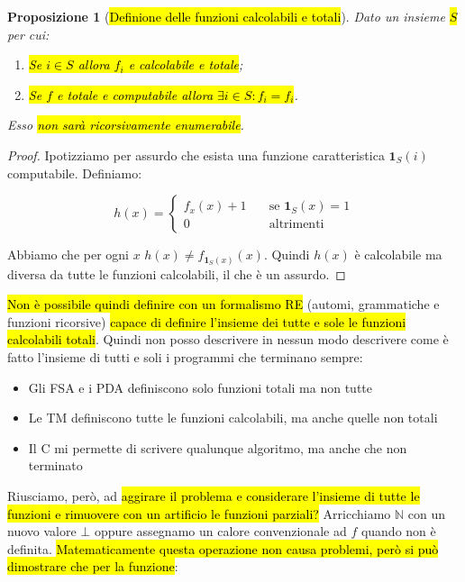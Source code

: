\documentclass[a4paper,11pt,twoside]{article}
\theoremstyle{plain}
\newtheorem{prop}{Proposizione}[section]
\theoremstyle{definition}
\theoremstyle{remark}
\begin{document}
\begin{prop}[\hl{Definione delle funzioni calcolabili e totali}]\label{thm:def-func-tot}
  Dato un insieme \hl{$S$} per cui:

  \begin{enumerate}
    \item \hl{Se $i \in S$ allora $f_i$ e calcolabile e totale};
    \item \hl{Se $f$ e totale e computabile allora $\exists i \in S : f_i =
      f_i$}.
  \end{enumerate}

  Esso \hl{non sarà ricorsivamente enumerabile}.
\end{prop}
\begin{proof}
  Ipotizziamo per assurdo che esista una funzione caratteristica
  $\mathbf{1}_S(i)$ computabile. Definiamo:

  \[
    h(x) =
    \begin{cases}
      f_x(x) + 1 & \quad \text{se } \mathbf{1}_S(x) = 1 \\
      0          & \quad \text{altrimenti}
    \end{cases}
  \]

  Abbiamo che per ogni $x$ $h(x) \neq f_{\mathbf{1}_S(x)}(x)$. Quindi $h(x)$ è
  calcolabile ma diversa da tutte le funzioni calcolabili, il che è un assurdo.
\end{proof}

\hl{Non è possibile quindi definire con un formalismo RE} (automi, grammatiche e
funzioni ricorsive) \hl{capace di definire l'insieme dei tutte e sole le
funzioni calcolabili totali}. Quindi non posso descrivere in nessun modo
descrivere come è fatto l'insieme di tutti e soli i programmi che terminano
sempre:

\begin{itemize}
  \item Gli FSA e i PDA definiscono solo funzioni totali ma non tutte
  \item Le TM definiscono tutte le funzioni calcolabili, ma anche quelle non
    totali
  \item Il C mi permette di scrivere qualunque algoritmo, ma anche che non
    terminato
\end{itemize}

Riusciamo, però, ad \hl{aggirare il problema e considerare l'insieme di tutte le
funzioni e rimuovere con un artificio le funzioni parziali?} Arricchiamo
$\mathbb{N}$ con un nuovo valore $\bot$ oppure assegnamo un calore convenzionale
ad $f$ quando non è definita. \hl{Matematicamente questa operazione non causa
problemi, però si può dimostrare che per la funzione}:
\end{document}
